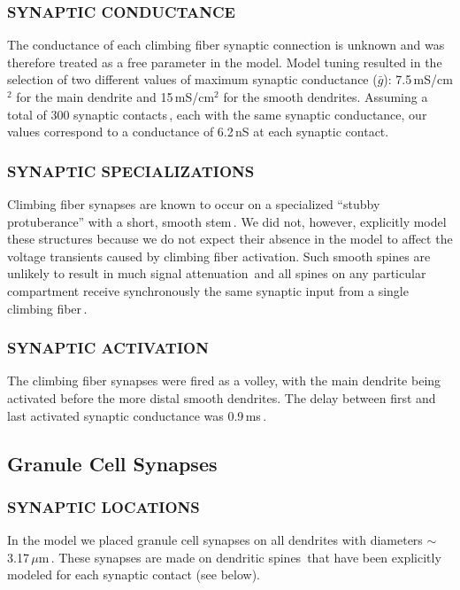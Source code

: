 \documentclass[12pt]{article}
\begin{document}
\subsubsection*{SYNAPTIC CONDUCTANCE}

The conductance of each climbing fiber synaptic connection is unknown and was therefore treated as a free parameter in the model. Model tuning resulted in the selection of two different values of maximum synaptic conductance ($\bar g$): 7.5\,mS/cm$^2$ for the main dendrite and 15\,mS/cm$^2$ for the smooth dendrites. Assuming a total of 300 synaptic contacts\,\cite{Ito:1984uq}, each with the same synaptic conductance, our values correspond to a conductance of 6.2\,nS at each synaptic contact.

\subsubsection*{SYNAPTIC SPECIALIZATIONS}

Climbing fiber synapses are known to occur on a specialized ``stubby protuberance'' with a
short, smooth stem\,\cite{Palay:1974fk}. We did not, however, explicitly model these structures because we do not expect their absence in the model to affect the voltage transients caused by climbing fiber activation. Such smooth spines are unlikely to result in much signal attenuation\,\cite{Rall:1990tg} and all spines on any particular compartment receive synchronously  the same synaptic input from a single climbing fiber\,\cite{Ito:1984uq}.

\subsubsection*{SYNAPTIC ACTIVATION}

The climbing fiber synapses were fired as a volley, with the main dendrite being activated before the more distal smooth dendrites. The delay between first and last activated synaptic conductance was 0.9\,ms\,\cite{Llinas 1980vn}.

\subsection*{Granule Cell Synapses}

\subsubsection*{SYNAPTIC LOCATIONS}

In the model we placed granule cell synapses on all dendrites with diameters $\sim$3.17\,$\mu$m\,\cite{Palay:1974fk}. These synapses are made on dendritic spines\,\cite{M:1988bh} that have been explicitly modeled for each synaptic contact (see below).
\end{document}

